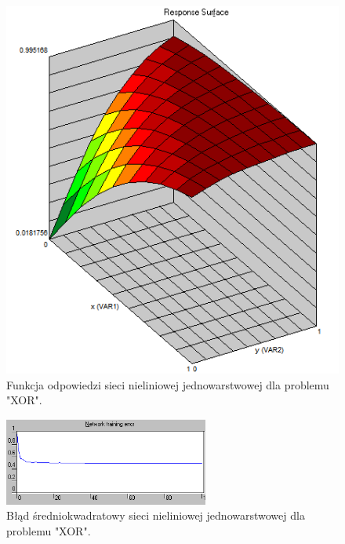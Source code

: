 \begin{enumerate}
\begin{figure}[h]
\centering
\includegraphics[scale=0.75]{dane/part1/zad2/response_nonlinear_xor}
\caption{Funkcja odpowiedzi sieci nieliniowej jednowarstwowej dla problemu "XOR".\label{fig:response_nonlinear_xor}}
\end{figure}

\begin{figure}[h]
\centering
\includegraphics[width=0.6\textwidth]{dane/part1/zad2/error_nonlinear_xor}
\caption{Błąd średniokwadratowy sieci nieliniowej jednowarstwowej dla problemu "XOR".\label{fig:error_nonlinear_xor}}
\end{figure}


\end{enumerate}

